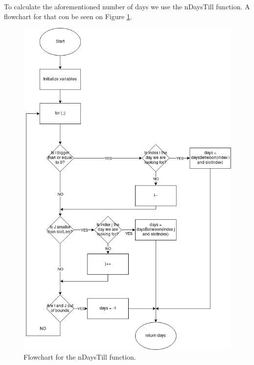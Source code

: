 To calculate the aforementioned number of days we use the nDaysTill function. A flowchart for that con be seen on Figure \ref{fig:flow_nDaysTill}.

\clearpage
\begin{figure}[ht!]
    \centering
    \includegraphics[width=\textwidth]{media/Flowcharts/nDaysTill_flow.png}
    \caption{Flowchart for the nDaysTill function.}
    \label{fig:flow_nDaysTill}
\end{figure}

